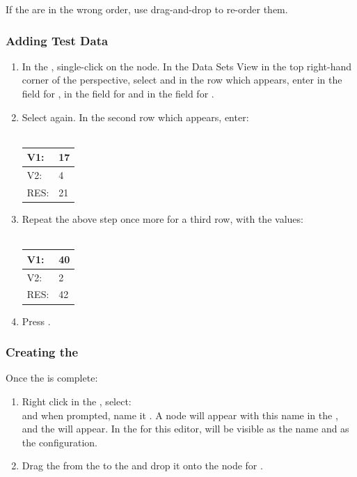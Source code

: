 If the \gdsteps are in the wrong order, use drag-and-drop to re-order them.

\subsubsection{Adding Test Data}

\begin{enumerate}

\item In the \gdtestcaseeditor{}, single-click on the 
 node. 
In the Data Sets View in the top right-hand corner of the 
perspective, select  and in the
row which appears, enter  in the  field for 
,  in the field for  and 
in the field for . 

\item Select   again. In the second row which appears, enter:
\\
\\
\begin{tabular}{|p{0.3\bxpicwidth}|p{0.3\bxpicwidth}|}\hline
 V1:& 17\\ \hline
 V2:& 4\\ \hline
 RES:& 21\\ \hline
\end{tabular}

\item Repeat the above step once more for a third row, with the values:
\\
\\
\begin{tabular}{|p{0.3\bxpicwidth}|p{0.3\bxpicwidth}|}\hline
 V1:& 40\\ \hline
 V2:& 2\\ \hline
 RES:& 42\\ \hline
\end{tabular}

\item Press .
\end{enumerate}

\subsubsection{Creating the \gdsuite}
Once the \gdcase is complete:
\begin{enumerate}
\item Right
 click in the \gdtestsuitebrowser{}, select:\\
 and when prompted,
 name it .
A \gdsuite node will appear with this name in the \gdtestsuitebrowser{}, and 
the \gdsuiteeditor will appear. In the \gdpropview for  this editor,
  will be visible as the  \gdaut name and
  as the \gdaut configuration.

\item Drag the \gdcase {} from the 
\gdtestcasebrowser to the \gdtestsuiteeditor{} and drop it onto the node for 
 \gdsuite{}. 
\end{enumerate}

